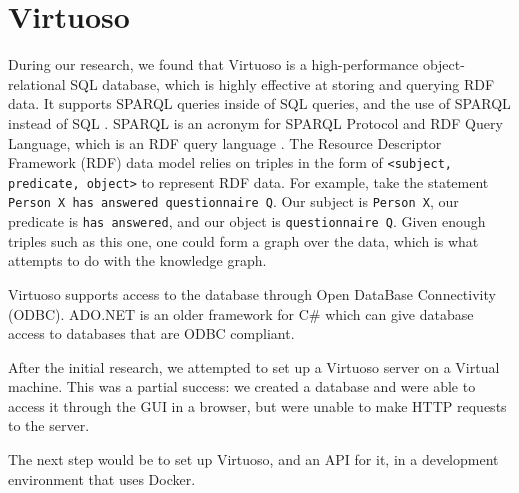 \section{Virtuoso}
During our research, we found that Virtuoso is a high-performance object-relational SQL database, which is highly effective at storing and querying RDF data. It supports SPARQL queries inside of SQL queries, and the use of SPARQL instead of SQL \cite{VirtuosoDataAcces}. SPARQL is an acronym for SPARQL Protocol and RDF Query Language, which is an RDF query language \cite{WhatIsSPARQL}.
The Resource Descriptor Framework (RDF) data model relies on triples in the form of \texttt{<subject, predicate, object>} to represent RDF data\cite{ResourceDescriptionFramework2021}. For example, take the statement \texttt{Person X has answered questionnaire Q}. Our subject is \texttt{Person X}, our predicate is \texttt{has answered}, and our object is \texttt{questionnaire Q}. Given enough triples such as this one, one could form a graph over the data, which is what \knox{} attempts to do with the knowledge graph.


Virtuoso supports access to the database through Open DataBase Connectivity (ODBC).
ADO.NET is an older framework for C\# which can give database access to databases that are ODBC compliant\cite{VirtuosoODBC}.

After the initial research, we attempted to set up a Virtuoso server on a Virtual machine. This was a partial success: we created a database and were able to access it through the GUI in a browser, but were unable to make HTTP requests to the server.

The next step would be to set up Virtuoso, and an API for it, in a development environment that uses Docker.